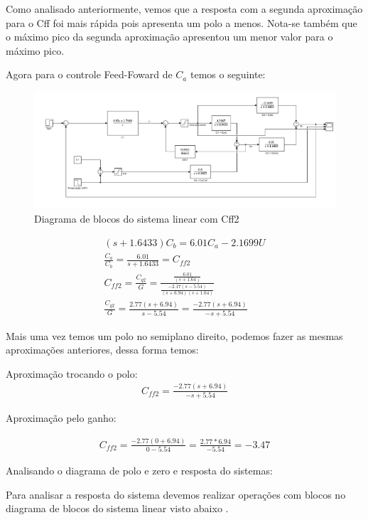 \documentclass[a4paper,12pt]{article}
\begin{document}
Como analisado anteriormente, vemos que a resposta com a segunda aproximação para o Cff foi mais rápida pois apresenta um polo a menos. Nota-se também que o máximo pico da segunda aproximação apresentou um menor valor para o máximo pico.

Agora para o controle Feed-Foward de \(C_a\) temos o seguinte:

\begin{figure} [H]
    \centering
    \includegraphics[width=0.8\linewidth]{image20.png}
    \caption{Diagrama de blocos do sistema linear com Cff2}
    
\end{figure}

\begin{align}
(s + 1.6433)C_b = 6.01C_a - 2.1699U\\
\frac{C_a}{C_b} = \frac{6.01}{s + 1.6433} = C_{ff2}\\
C_{ff2} = \frac{C_{q2}}{G} = \frac{\frac{6.01}{(s+1.64)}}{\frac{-2.17(s-5.54)}{(s+6.94)(s+1.64)}}\\
\frac{C_{q2}}{G} = \frac{2.77(s+6.94)}{s-5.54}= \frac{-2.77(s+6.94)}{-s+5.54} 
\end{align}

Mais uma vez temos um polo no semiplano direito, podemos fazer as mesmas aproximações anteriores, dessa forma temos:

Aproximação trocando o polo:
\begin{align}
C_{ff2} = \frac{-2.77(s+6.94)}{-s+5.54} 
\end{align}

Aproximação pelo ganho:

\begin{align}
C_{ff2} =\frac{-2.77(0+6.94)}{0-5.54} = \frac{2.77*6.94}{-5.54} = -3.47
\end{align}


Analisando o diagrama de polo e zero e resposta do sistemas:

Para analisar a resposta do sistema devemos realizar operações com blocos no diagrama de blocos do sistema linear visto abaixo . 
\end{document}
